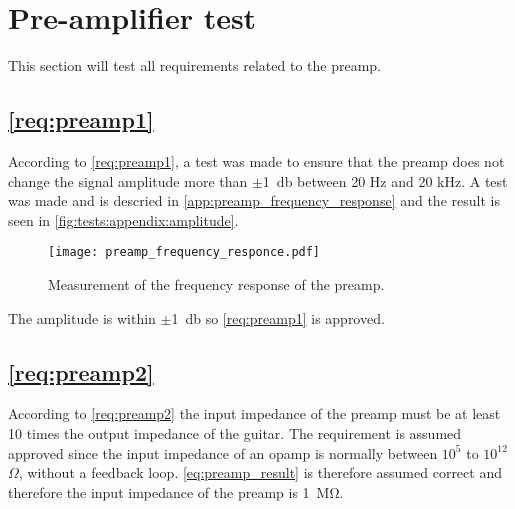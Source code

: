 \newpage
\section{Pre-amplifier test}
This section will test all requirements related to the \gls{preamp}. 


\subsection{\autoref{req:preamp1}}
According to \autoref{req:preamp1}, a test was made to ensure that the \gls{preamp} does not change the signal amplitude more than $\pm$\SI{1}{\decibel} between 20 Hz and 20 kHz. A test was made and is descried in \autoref{app:preamp_frequency_response} and the result is seen in \autoref{fig:tests:appendix:amplitude}.

\begin{figure}[htbp!]
	\centering
		\texttt{[image: preamp\_frequency\_responce.pdf]}
		\caption{Measurement of the frequency response of the \gls{preamp}.}
		\label{fig:tests:appendix:amplitude}
\end{figure}

The amplitude is within $\pm$\SI{1}{\decibel} so \autoref{req:preamp1} is approved.


\subsection{\autoref{req:preamp2}}
According to \autoref{req:preamp2} the input impedance of  the \gls{preamp} must be at least 10 times the output impedance of the guitar. The requirement is assumed approved since the input impedance of an \gls{opamp} is normally between $10^5$ to $10^{12}$ $\Omega$, without a feedback loop. \autoref{eq:preamp_result} is therefore assumed correct and therefore the input impedance of the \gls{preamp} is \SI{1}{\mega\ohm}.
%
%



